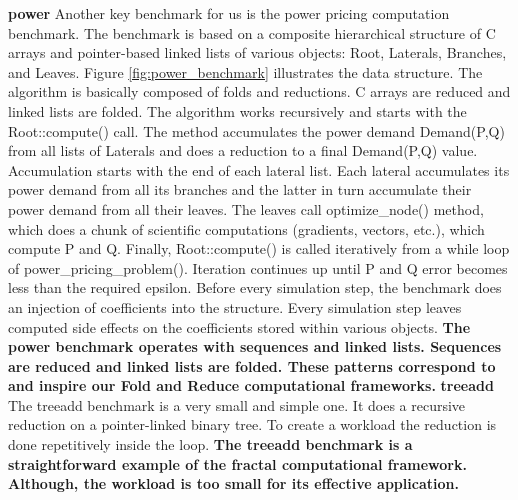 \quad \textbf{power} \quad Another key benchmark for us is the power pricing computation benchmark. The benchmark is based on a composite hierarchical structure of C arrays and pointer-based linked lists of various objects: Root, Laterals, Branches, and Leaves. Figure \ref{fig:power_benchmark} illustrates the data structure. The algorithm is basically composed of folds and reductions. C arrays are reduced and linked lists are folded. The algorithm works recursively and starts with the Root::compute() call. The method accumulates the power demand
Demand(P,Q) from all lists of Laterals and does a reduction to a final Demand(P,Q) value. Accumulation starts with the end of each lateral list. Each lateral accumulates its power demand from all its branches and the latter in turn accumulate their power demand from all their leaves. The leaves call optimize\_node() method, which does a chunk of scientific computations (gradients, vectors, etc.), which compute P and Q. Finally, Root::compute() is called iteratively from a while loop of power\_pricing\_problem(). Iteration continues up until P and Q error becomes less than the required epsilon. Before every simulation step, the benchmark does an injection of coefficients into the structure. Every simulation step leaves computed side effects on the coefficients stored within various objects.\newline\null
\quad \textbf{The power benchmark operates with sequences and linked lists. Sequences are reduced and linked lists are folded. These patterns correspond to and inspire our Fold and Reduce computational frameworks.}\newline\null
\quad \textbf{treeadd} \quad The treeadd benchmark is a very small and simple one. It does a recursive reduction on a pointer-linked binary tree. To create a workload the reduction is done repetitively inside the loop.\newline\null
\quad \textbf{The treeadd benchmark is a straightforward example of the fractal computational framework. Although, the workload is too small for its effective application.}\newline\null
